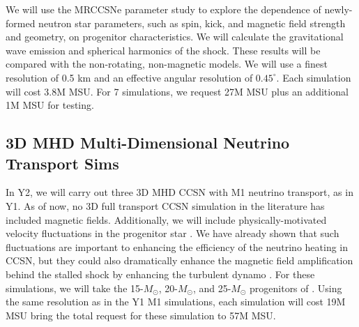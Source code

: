 We will use the MRCCSNe parameter study to explore the dependence of newly-formed neutron star parameters, such as spin, kick, and magnetic field strength and geometry, on progenitor characteristics.
We will calculate the gravitational wave emission and spherical harmonics of the shock.
These results will be compared with the non-rotating, non-magnetic models.
We will use a finest resolution of 0.5 km and an effective angular resolution of $0.45^\circ$.
Each simulation will cost 3.8M MSU.  For 7 simulations, we request 27M MSU plus an additional 1M MSU for testing.

\subsection{3D MHD Multi-Dimensional Neutrino Transport Sims}
\label{sec:enhancedM1}

In Y2, we will carry out three 3D MHD CCSN with M1 neutrino transport, as in Y1.
As of now, no 3D full transport CCSN simulation in the literature has included magnetic fields.
Additionally, we will include physically-motivated velocity fluctuations in the progenitor star \citep{Couch:2013bl, Chatzopoulos:2014uj}.
We have already shown that such fluctuations are important to enhancing the efficiency of the neutrino heating in CCSN, but they could also dramatically enhance the magnetic field amplification behind the stalled shock by enhancing the turbulent dynamo \citep[e.g.][]{Endeve:2012ht}.
For these simulations, we will take the 15-$M_\odot$, 20-$M_\odot$, and 25-$M_\odot$ progenitors of \citet{Heger:2005bi}.
Using the same resolution as in the Y1 M1 simulations, each simulation will cost 19M MSU bring the total request for these simulation to 57M MSU.

